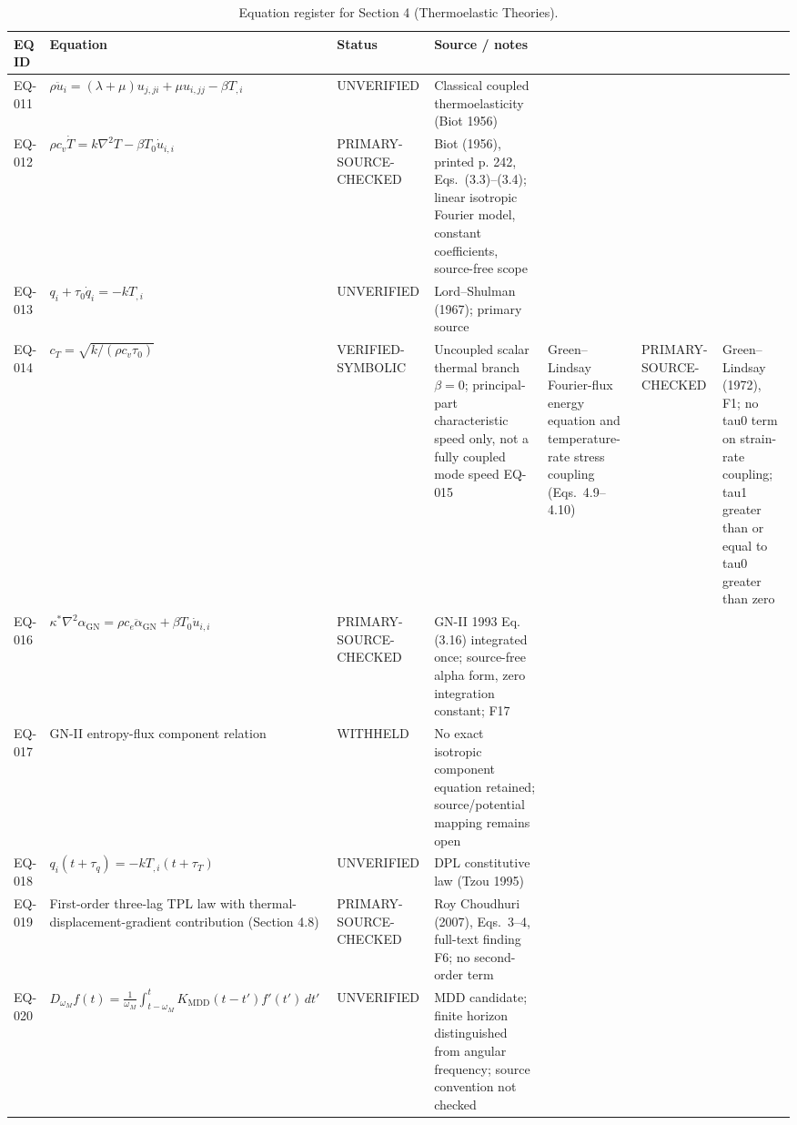\begin{table}[htbp]
\centering
\small
\setlength{\tabcolsep}{3pt}
\caption{Equation register for Section 4 (Thermoelastic Theories).}
\label{tab:appA-sec4}
\begin{tabularx}{\textwidth}{@{}p{1.6cm}Y p{2.8cm}Y@{}}
\toprule
\textbf{EQ ID} & \textbf{Equation} & \textbf{Status} & \textbf{Source / notes} \\
\midrule
EQ-011 & $\rho\ddot{u}_i = (\lambda+\mu)u_{j,ji} + \mu u_{i,jj} - \beta T_{,i}$ & UNVERIFIED & Classical coupled thermoelasticity (Biot 1956) \\
EQ-012 & $\rho c_v \dot{T} = k\nabla^2 T - \beta T_0 \dot{u}_{i,i}$ & PRIMARY-SOURCE-CHECKED & Biot (1956), printed p. 242, Eqs.~(3.3)--(3.4); linear isotropic Fourier model, constant coefficients, source-free scope \\
EQ-013 & $q_i + \tau_0\dot{q}_i = -kT_{,i}$ & UNVERIFIED & Lord--Shulman (1967); primary source \\
EQ-014 & $c_T = \sqrt{k/(\rho c_v\tau_0)}$ & VERIFIED-SYMBOLIC & Uncoupled scalar thermal branch $\beta=0$; principal-part characteristic speed only, not a fully coupled mode speed
EQ-015 & Green--Lindsay Fourier-flux energy equation and temperature-rate stress coupling (Eqs.~4.9--4.10) & PRIMARY-SOURCE-CHECKED & Green--Lindsay (1972), F1; no tau0 term on strain-rate coupling; tau1 greater than or equal to tau0 greater than zero \\
EQ-016 & $\kappa^*\nabla^2\alpha_{\mathrm{GN}} = \rho c_e\ddot{\alpha}_{\mathrm{GN}} + \beta T_0\dot{u}_{i,i}$ & PRIMARY-SOURCE-CHECKED & GN-II 1993 Eq. (3.16) integrated once; source-free alpha form, zero integration constant; F17 \\
EQ-017 & GN-II entropy-flux component relation & WITHHELD & No exact isotropic component equation retained; source/potential mapping remains open \\
EQ-018 & $q_i(t+\tau_q) = -kT_{,i}(t+\tau_T)$ & UNVERIFIED & DPL constitutive law (Tzou 1995) \\
EQ-019 & First-order three-lag TPL law with thermal-displacement-gradient contribution (Section 4.8) & PRIMARY-SOURCE-CHECKED & Roy Choudhuri (2007), Eqs.~3--4, full-text finding F6; no second-order term \\
EQ-020 & $D_{\omega_M} f(t) = \tfrac{1}{\omega_M}\int_{t-\omega_M}^{t}K_{\mathrm{MDD}}(t-t')f'(t')\,dt'$ & UNVERIFIED & MDD candidate; finite horizon distinguished from angular frequency; source convention not checked \\

\end{tabularx}
\end{table}
